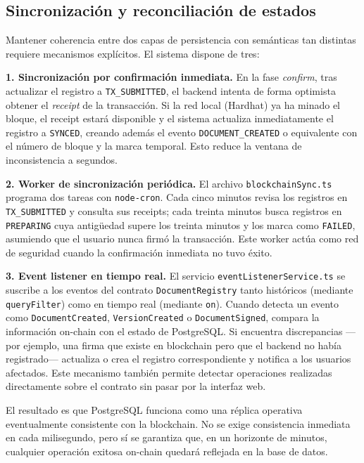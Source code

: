 \documentclass[11pt, a4paper]{article}
\begin{document}
\subsection{Sincronización y reconciliación de estados}

Mantener coherencia entre dos capas de persistencia con semánticas tan distintas requiere mecanismos explícitos. El sistema dispone de tres:

\textbf{1. Sincronización por confirmación inmediata.} En la fase \textit{confirm}, tras actualizar el registro a \texttt{TX\_SUBMITTED}, el backend intenta de forma optimista obtener el \textit{receipt} de la transacción. Si la red local (Hardhat) ya ha minado el bloque, el receipt estará disponible y el sistema actualiza inmediatamente el registro a \texttt{SYNCED}, creando además el evento \texttt{DOCUMENT\_CREATED} o equivalente con el número de bloque y la marca temporal. Esto reduce la ventana de inconsistencia a segundos.

\textbf{2. Worker de sincronización periódica.} El archivo \texttt{blockchainSync.ts} programa dos tareas con \texttt{node-cron}. Cada cinco minutos revisa los registros en \texttt{TX\_SUBMITTED} y consulta sus receipts; cada treinta minutos busca registros en \texttt{PREPARING} cuya antigüedad supere los treinta minutos y los marca como \texttt{FAILED}, asumiendo que el usuario nunca firmó la transacción. Este worker actúa como red de seguridad cuando la confirmación inmediata no tuvo éxito.

\textbf{3. Event listener en tiempo real.} El servicio \texttt{eventListenerService.ts} se suscribe a los eventos del contrato \texttt{DocumentRegistry} tanto históricos (mediante \texttt{queryFilter}) como en tiempo real (mediante \texttt{on}). Cuando detecta un evento como \texttt{DocumentCreated}, \texttt{VersionCreated} o \texttt{DocumentSigned}, compara la información on-chain con el estado de PostgreSQL. Si encuentra discrepancias ---por ejemplo, una firma que existe en blockchain pero que el backend no había registrado--- actualiza o crea el registro correspondiente y notifica a los usuarios afectados. Este mecanismo también permite detectar operaciones realizadas directamente sobre el contrato sin pasar por la interfaz web.

El resultado es que PostgreSQL funciona como una réplica operativa eventualmente consistente con la blockchain. No se exige consistencia inmediata en cada milisegundo, pero sí se garantiza que, en un horizonte de minutos, cualquier operación exitosa on-chain quedará reflejada en la base de datos.
\end{document}
